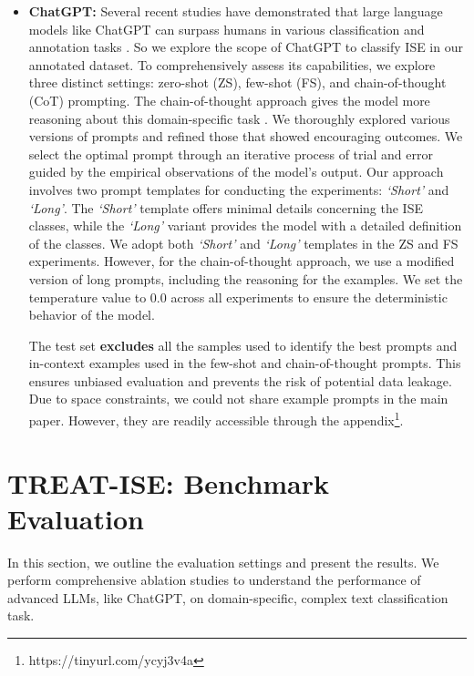 \documentclass[letterpaper]{article}
\begin{document}
\begin{itemize}
\item \textbf{ChatGPT:} Several recent studies have demonstrated that large language models like ChatGPT can surpass humans in various classification and annotation tasks \cite{10.1001/jamainternmed.2023.2909, Gilardi_2023}. So we explore the scope of ChatGPT \cite{ouyang2022training} to classify ISE in our annotated dataset. To comprehensively assess its capabilities, we explore three distinct settings: zero-shot (ZS), few-shot (FS), and chain-of-thought (CoT) \cite{NEURIPS2022_9d560961} prompting. The chain-of-thought approach gives the model more reasoning about this domain-specific task \cite{min-etal-2022-rethinking}.
We thoroughly explored various versions of prompts and refined those that showed encouraging outcomes. We select the optimal prompt through an iterative process of trial and error guided by the empirical observations of the model's output. Our approach involves two prompt templates for conducting the experiments: \textit{`Short'} and \textit{`Long'}. The \textit{`Short'} template offers minimal details concerning the ISE classes, while the \textit{`Long'} variant provides the model with a detailed definition of the classes. We adopt both \textit{`Short'} and \textit{`Long'} templates in the ZS and FS experiments. However, for the chain-of-thought approach, we use a modified version of long prompts, including the reasoning for the examples. We set the temperature value to 0.0 across all experiments to ensure the deterministic behavior of the model.

The test set \textbf{excludes} all the samples used to identify the best prompts and in-context examples used in the few-shot and chain-of-thought prompts. This ensures unbiased evaluation and prevents the risk of potential data leakage. Due to space constraints, we could not share example prompts in the main paper. However, they are readily accessible through the appendix\footnote{https://tinyurl.com/ycyj3v4a}.

\end{itemize}




\section{TREAT-ISE: Benchmark Evaluation}

In this section, we outline the evaluation settings and present the results. We perform comprehensive ablation studies to understand the performance of advanced LLMs, like ChatGPT, on domain-specific, complex text classification task.
\end{document}
